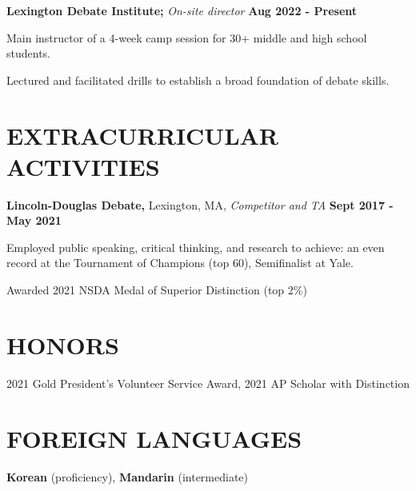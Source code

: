 \documentclass[11pt]{article}
\begin{document}
\raggedright
\textbf{Lexington Debate Institute;} \textit{On-site director} \hfill \textbf{Aug 2022 - Present} 
\begin{sublist}
	\item Main instructor of a 4-week camp session for 30+ middle and high school students. 
	\item Lectured and facilitated drills to establish a broad foundation of debate skills.
\end{sublist}

\section*{EXTRACURRICULAR ACTIVITIES}
\textbf{Lincoln-Douglas Debate,} Lexington, MA, \textit{Competitor and TA} \hfill \textbf{Sept 2017 - May 2021}
\begin{sublist}
  \item Employed public speaking, critical thinking, and research to achieve: an even record at the Tournament of Champions (top 60), Semifinalist at Yale.
  \item Awarded 2021 NSDA Medal of Superior Distinction (top 2\%)
\end{sublist}

\section*{HONORS}
2021 Gold President’s Volunteer Service Award, 2021 AP Scholar with Distinction

\section*{FOREIGN LANGUAGES}
\textbf{Korean} (proficiency), \textbf{Mandarin} (intermediate)
\end{document}
